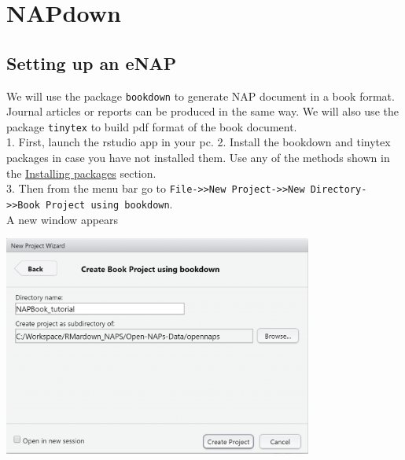 \documentclass[
]{book}
\let\origfigure\figure
\let\endorigfigure\endfigure
\renewenvironment{figure}[1][2] {
    \expandafter\origfigure\expandafter[H]
} {
    \endorigfigure
}
\begin{document}
\hypertarget{napdown}{%
\chapter{NAPdown}\label{napdown}}

\hypertarget{setting-up-an-enap}{%
\section{Setting up an eNAP}\label{setting-up-an-enap}}

We will use the package \texttt{bookdown} to generate NAP document in a book format. Journal articles or reports can be produced in the same way.
We will also use the package \texttt{tinytex} to build pdf format of the book document.\\
1. First, launch the rstudio app in your pc.
2. Install the bookdown and tinytex packages in case you have not installed them. Use any of the methods shown in the \protect\hyperlink{installing-packages}{Installing packages} section.\\
3. Then from the menu bar go to \texttt{File-\textgreater{}\textgreater{}New\ Project-\textgreater{}\textgreater{}New\ Directory-\textgreater{}\textgreater{}Book\ Project\ using\ bookdown}.\\
A new window appears

\begin{figure}
\centering
\includegraphics[width=4in,height=\textheight]{tutorial_screenshots/open_bkdown_proj.png}
\caption{Create Bookdown project\ldots{}}
\end{figure}
\end{document}
